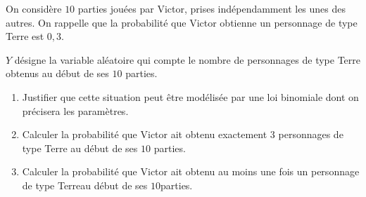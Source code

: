 \bigbreak
{}
\medbreak
\par
On considère $10$ parties jouées par Victor, prises indépendamment les unes des autres.
On rappelle que la probabilité que Victor obtienne un personnage de type \og Terre\fg{} est $0,3$.
\par
$Y$ désigne la variable aléatoire qui compte le nombre de personnages de type \og Terre\fg{} obtenus au début de ses $10$ parties.
\par
\medbreak
\begin{enumerate}
     \item Justifier que cette situation peut être modélisée par une loi binomiale dont on précisera les paramètres.
     \item Calculer la probabilité que Victor ait obtenu exactement 3 personnages de type \og Terre\fg{} au début de ses $10$ parties.
     \item Calculer la probabilité que Victor ait obtenu au moins une fois un personnage de type
     \og Terre\fg au début de ses $10$parties.
\end{enumerate}
